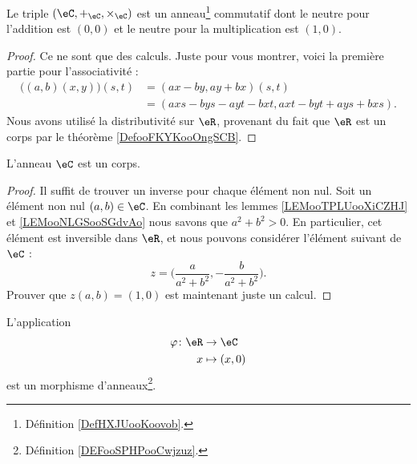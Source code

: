 \begin{lemma}
    Le triple \( (\eC,+_{\eC}, \times_{\eC})\) est un anneau\footnote{Définition \ref{DefHXJUooKoovob}.} commutatif dont le neutre pour l'addition est \( (0,0)\) et le neutre pour la multiplication est \( (1,0)\).
\end{lemma}

\begin{proof}
    Ce ne sont que des calculs. Juste pour vous montrer, voici la première partie pour l'associativité :
    \begin{subequations}
        \begin{align}
            \big( (a,b)(x,y) \big)(s,t)&=(ax-by,ay+bx)(s,t)\\
            &=(axs-bys-ayt-bxt,axt-byt+ays+bxs).
        \end{align}
    \end{subequations}
    Nous avons utilisé la distributivité sur \( \eR\), provenant du fait que \( \eR\) est un corps par le théorème \ref{DefooFKYKooOngSCB}.
\end{proof}

\begin{lemma}
    L'anneau \( \eC\) est un corps.
\end{lemma}

\begin{proof}
    Il suffit de trouver un inverse pour chaque élément non nul. Soit un élément non nul \( (a,b)\in \eC\). En combinant les lemmes \ref{LEMooTPLUooXiCZHJ} et \ref{LEMooNLGSooSGdvAo} nous savons que \( a^2+b^2>0\). En particulier, cet élément est inversible dans \( \eR\), et nous pouvons considérer l'élément suivant de \( \eC\) :
    \begin{equation}
        z=\big( \frac{ a }{ a^2+b^2 }, -\frac{ b }{ a^2+b^2 } \big).
    \end{equation}
    Prouver que \( z(a,b)=(1,0)\) est maintenant juste un calcul.
\end{proof}

\begin{lemma}
    L'application
    \begin{equation}
        \begin{aligned}
            \varphi\colon \eR&\to \eC \\
            x&\mapsto (x,0) 
        \end{aligned}
    \end{equation}
    est un morphisme d'anneaux\footnote{Définition \ref{DEFooSPHPooCwjzuz}.}.
\end{lemma}

